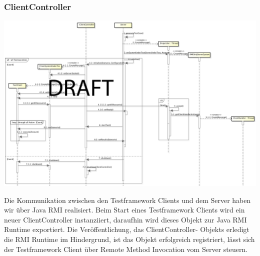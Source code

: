 \subsubsection{ClientController}
\label{sec:clientController}

\begin{center}
\includegraphics[scale=0.3]{image_testFramework/TestFWServerClientSeq.png}
\end{center}
 
Die Kommunikation zwischen den Testframework Clients und dem Server haben wir über Java RMI realisiert. Beim Start eines Testframework Clients wird ein neuer ClientController instanziiert, daraufhin wird dieses Objekt zur Java RMI Runtime exportiert. Die Veröffentlichung, das ClientController- Objekts erledigt die RMI Runtime im Hindergrund, ist das Objekt erfolgreich registriert, lässt sich der Testframework Client über Remote Method Invocation vom Server steuern.

